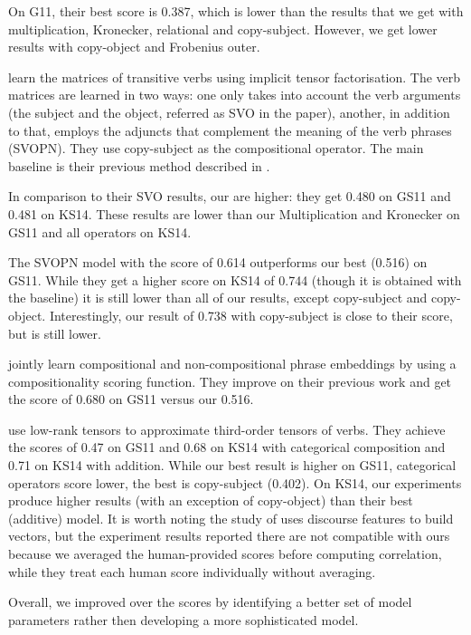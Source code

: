 On G11, their best score is 0.387, which is lower than the results that we get with multiplication, Kronecker, relational and copy-subject. However, we get lower results with copy-object and Frobenius outer.

 learn the matrices of transitive verbs using implicit tensor factorisation. The verb matrices are learned in two ways: one only takes into account the verb arguments (the subject and the object, referred as SVO in the paper), another, in addition to that, employs the adjuncts that complement the meaning of the verb phrases (SVOPN). They use copy-subject as the compositional operator. The main baseline is their previous method described in .

In comparison to their SVO results, our are higher: they get 0.480 on GS11 and 0.481 on KS14. These results are lower than our Multiplication and Kronecker on GS11 and all operators on KS14.

The SVOPN model with the score of 0.614 outperforms our best (0.516) on GS11. While they get a higher score on KS14 of 0.744 (though it is obtained with the  baseline) it is still lower than all of our results, except copy-subject and copy-object. Interestingly, our result of 0.738 with copy-subject is close to their score, but is still lower.

 jointly learn compositional and non-compositional phrase embeddings by using a compositionality scoring function. They improve on their previous work and get the score of 0.680 on GS11 versus our 0.516.

 use low-rank tensors to approximate third-order tensors of verbs. They achieve the scores of 0.47 on GS11 and 0.68 on KS14 with categorical composition and 0.71 on KS14 with addition. While our best result is higher on GS11, categorical operators score lower, the best is copy-subject (0.402). On KS14, our experiments produce higher results (with an exception of copy-object) than their best (additive) model. It is worth noting the study of  uses discourse features to build vectors, but the experiment results reported there are not compatible with ours because we averaged the human-provided scores before computing correlation, while they treat each human score individually without averaging.

Overall, we improved over the scores by identifying a better set of model
parameters rather then developing a more sophisticated model.

